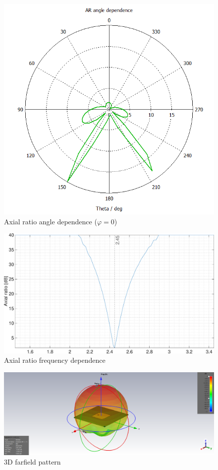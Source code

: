 \documentclass[11pt,a4paper]{article}
\begin{document}
        \begin{figure}[!ht]
            \centering
            \includegraphics[width=.7\textwidth]{src/axial-ratio-angle.png}
            \caption{\label{fig:axial-ratio-angle}Axial ratio angle dependence ($\varphi=0$)}
        \end{figure}

        \begin{figure}[!ht]
            \centering
            \includegraphics[width=.8\textwidth]{src/axial-ratio.eps}
            \caption{\label{fig:axial-ratio}Axial ratio frequency dependence}
        \end{figure}

        \begin{figure}[!ht]
            \centering
            \includegraphics[width=.8\textwidth]{src/farfield.png}
            \caption{\label{fig:farfield}3D farfield pattern}
        \end{figure}
\end{document}
